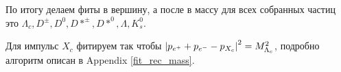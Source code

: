 По итогу делаем фиты в вершину, а после в массу для всех собранных частиц это 
$\Lambda_c, D^{\pm}, D^0, D*^{\pm}, D*^0, \Lambda, K_s^0$.

\newdot Для импульс $X_c$ фитируем так чтобы $\abs{p_{e^+} + p_{e^-} - p_{X_c}}^2 = M^2_{\Lambda_c}$, 
подробно алгоритм описан в Appendix \ref{fit_rec_mass}. 

 







